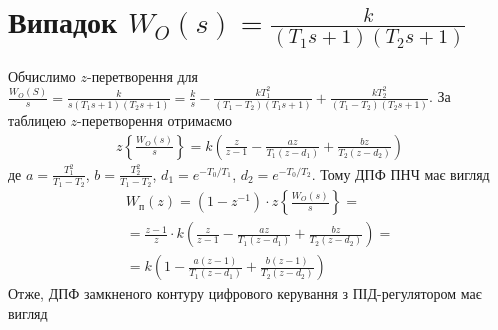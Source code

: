\section{Випадок \texorpdfstring{$W_O(s) = \frac{k}{(T_1 s + 1)(T_2 s + 1)}$}{2}}
Обчислимо $z$-перетворення для $\frac{W_O(S)}{s} = \frac{k}{s(T_1 s + 1)(T_2 s + 1)} = 
\frac{k}{s} - \frac{k T_1^2}{(T_1 - T_2) (T_1 s + 1)} + \frac{k T_2^2}{(T_1 - T_2) (T_2 s + 1)}$.
За таблицею $z$-перетворення отримаємо
\begin{gather}
    z\left\{\frac{W_O(s)}{s} \right\} = 
    k \left(
        \frac{z}{z-1} - \frac{az}{T_1 (z - d_1)} +
        \frac{bz}{T_2 (z - d_2)}
    \right)
\end{gather}
де $a = \frac{T_1^2}{T_1 - T_2}$, $b = \frac{T_2^2}{T_1 - T_2}$,
$d_1 = e^{-T_0 / T_1}$, $d_2 = e^{-T_0 / T_2}$.
Тому ДПФ ПНЧ має вигляд
\begin{gather}
    W_{\text{п}}(z) = \left(1 - z^{-1}\right) \cdot z\left\{\frac{W_O(s)}{s} \right\} = 
    \nonumber \\ =
    \frac{z-1}{z} \cdot k \left(
        \frac{z}{z-1} - \frac{az}{T_1 (z - d_1)} +
        \frac{bz}{T_2 (z - d_2)}
    \right) = \nonumber \\ =
    k \left(
        1 - \frac{a(z-1)}{T_1 (z - d_1)} +
        \frac{b(z-1)}{T_2 (z - d_2)}
    \right)
\end{gather}
Отже, ДПФ замкненого контуру цифрового керування з ПІД-регулятором має вигляд
